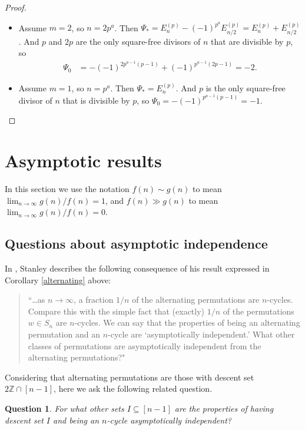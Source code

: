 \documentclass[12pt]{article}
\newcommand{\Perm}{S}
\newcommand{\ZZ}{\mathbb{Z}}
\newtheorem*{question}{Question}
\theoremstyle{definition}
\begin{document}
\begin{proof}
\begin{itemize}
\item Assume $m = 2$, so $n = 2p^a$. Then $\Psi_* = E_n^{(p)} - (-1)^{p^a}E_{n/2}^{(p)} = E_n^{(p)} + E_{n/2}^{(p)}$. And $p$ and $2p$ are the only square-free divisors of $n$ that are divisible by $p$, so
\begin{align*} \Psi_0 &= -(-1)^{2p^{a-1}(p-1)} + (-1)^{p^{a-1}(2p-1)} = -2. \end{align*}

\item Assume $m = 1$, so $n = p^a$. Then $\Psi_* = E_n^{(p)}$. And $p$ is the only square-free divisor of $n$ that is divisible by $p$, so $\Psi_0 = -(-1)^{p^{a-1}(p-1)} = -1$. \qedhere
\end{itemize}\end{proof}

\section{Asymptotic results} \label{AsymptoticSection}

In this section we use the notation $f(n)\sim g(n)$ to mean $\lim_{n\to\infty} g(n)/f(n)=1$, and $f(n)\gg g(n)$ to mean $\lim_{n\to\infty} g(n)/f(n)=0$.

\subsection{Questions about asymptotic independence}\label{sec:independence}

In \cite[Sec.\ 5]{StanleySurvey}, Stanley describes the following consequence of his result expressed in Corollary \ref{alternating} above:
\begin{quote}``\ldots as $n \to \infty$, a fraction $1/n$ of the alternating permutations are $n$-cycles. Compare this with the simple fact that (exactly) $1/n$ of the permutations $w \in \Perm_n$ are $n$-cycles. We can say that the properties of being an alternating permutation and an $n$-cycle are `asymptotically independent.' What other classes of permutations are asymptotically independent from the alternating permutations?"\end{quote}

Considering that alternating permutations are those with descent set $2\ZZ\cap[n-1]$, here we ask the following related question.
\begin{question} For what other sets $I \subseteq [n-1]$ are the properties of having descent set $I$ and being an $n$-cycle asymptotically independent?
\end{question} 
\end{document}
